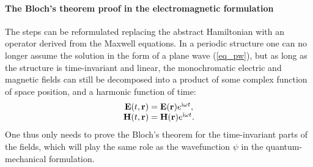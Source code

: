 \paragraph{The Bloch's theorem proof in the electromagnetic formulation}%
The steps can be reformulated replacing the abstract Hamiltonian with an operator derived from the Maxwell equations. In a periodic structure one can no longer assume the solution in the form of a plane wave (\ref{eq_pw}), but as long as the structure is time-invariant and linear, the monochromatic electric and magnetic fields can still be decomposed into a product of some complex function of space position, and a harmonic function of time:
\begin{equation} 
\begin{array}{cc}
\mathbf{E}(t, {\mathbf{r}}) = \mathbf{E}({\mathbf{r}}) e^{{\mathrm i} \omega t}, \\
\mathbf{H}(t, {\mathbf{r}}) = \mathbf{H}({\mathbf{r}}) e^{{\mathrm i} \omega t}. 
\end{array}
\label{eq_harmonic}\end{equation}
One thus only needs to prove the Bloch's theorem for the time-invariant parts of the fields, which will play the same role as the wavefunction $\psi$ in the quantum-mechanical formulation.

